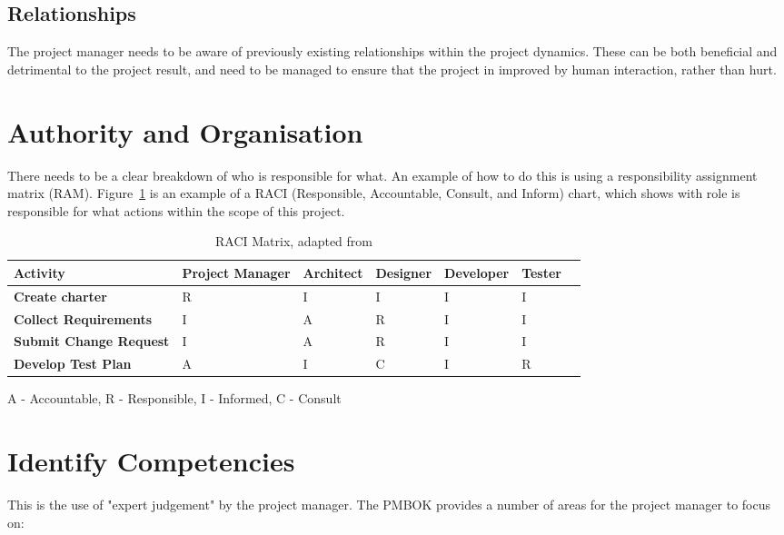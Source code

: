 \subsection{Relationships}

The project manager needs to be aware of previously existing relationships within the project dynamics. These can be both beneficial and detrimental to the project result, and need to be managed to ensure that the project in improved by human interaction, rather than hurt. 

\section{Authority and Organisation}

There needs to be a clear breakdown of who is responsible for what. An example of how to do this is using a responsibility assignment matrix (RAM). Figure~\ref{fig:ram} is an example of a RACI (Responsible, Accountable, Consult, and Inform) chart, which shows with role is responsible for what actions within the scope of this project.

\begin{table}[H]
\caption{RACI Matrix, adapted from \parencite{pmbok}}
\begin{center}
    \begin{tabular}{ | l | l | l | l | l | l | p{5cm} |}
    \hline
	\textbf{Activity} & \textbf{Project Manager} & \textbf{Architect} & \textbf{Designer} & \textbf{Developer} & \textbf{Tester}\\ \hline
	\textbf{Create charter} & R & I & I & I & I \\ \hline
	\textbf{Collect Requirements} & I & A & R & I & I \\ \hline
	\textbf{Submit Change Request} & I & A & R & I & I \\ \hline
	\textbf{Develop Test Plan} & A & I & C & I & R \\ \hline
    \end{tabular}
	A - Accountable, R - Responsible, I - Informed, C - Consult

\end{center}
\label{fig:ram}
\end{table}

\section{Identify Competencies}

This is the use of "expert judgement" \parencite{pmbok} by the project manager. The PMBOK provides a number of areas for the project manager to focus on:

